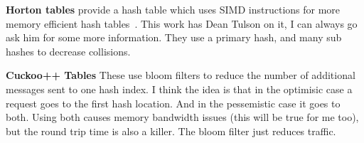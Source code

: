 \textbf{Horton tables} provide a hash table which uses SIMD instructions for
more memory efficient hash tables~\cite{horton}. This work has Dean Tulson on
it, I can always go ask him for some more information. They use a primary hash,
and many sub hashes to decrease collisions. 

\textbf{Cuckoo++ Tables} These use bloom filters to reduce the number of
additional messages sent to one hash index. I think the idea is that in the
optimisic case a request goes to the first hash location. And in the pessemistic
case it goes to both. Using both causes memory bandwidth issues (this will be
true for me too), but the round trip time is also a killer. The bloom filter
just reduces traffic.

